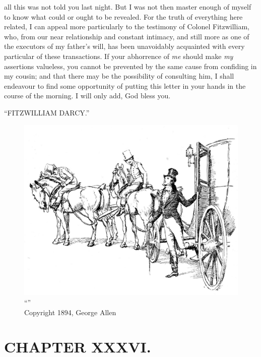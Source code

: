 all this was not told you last night. But I was not then master enough of myself to know what could or ought to be revealed. For the truth of everything here related, I can appeal more particularly to the testimony of Colonel Fitzwilliam, who, from our near relationship and constant intimacy, and still more as one of the executors of my father's will, has been unavoidably acquainted with every particular of these transactions. If your abhorrence of \textit{me} should make \textit{my} assertions valueless, you cannot be prevented by the same cause from confiding in my cousin; and that there may be the possibility of consulting him, I shall endeavour to find some opportunity of putting this letter in your hands in the course of the morning. I will only add, God bless you.

``FITZWILLIAM DARCY.''

\begin{figure}[htbp]
    \centering
    \includegraphics[width=\textwidth]{illustrations/i_031.jpg}
    \caption{“”\\ Copyright 1894, George Allen}
    \label{fig:image}
\end{figure}


\chapter{CHAPTER XXXVI.}

